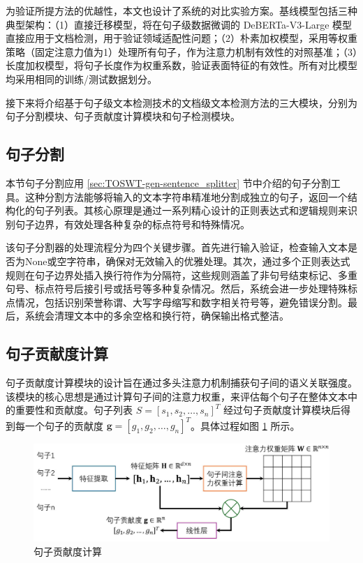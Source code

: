 为验证所提方法的优越性，本文也设计了系统的对比实验方案。基线模型包括三种典型架构：（1）直接迁移模型，将在句子级数据微调的 DeBERTa-V3-Large 模型直接应用于文档检测，用于验证领域适配性问题；（2）朴素加权模型，采用等权重策略（固定注意力值为1）处理所有句子，作为注意力机制有效性的对照基准；（3）长度加权模型，将句子长度作为权重系数，验证表面特征的有效性。所有对比模型均采用相同的训练/测试数据划分。

接下来将介绍基于句子级文本检测技术的文档级文本检测方法的三大模块，分别为句子分割模块、句子贡献度计算模块和句子检测模块。

\subsection{句子分割}

本节句子分割应用 \ref{sec:TOSWT-gen-sentence_splitter} 节中介绍的句子分割工具。这种分割方法能够将输入的文本字符串精准地分割成独立的句子，返回一个结构化的句子列表。其核心原理是通过一系列精心设计的正则表达式和逻辑规则来识别句子边界，有效处理各种复杂的标点符号和特殊情况。

该句子分割器的处理流程分为四个关键步骤。首先进行输入验证，检查输入文本是否为None或空字符串，确保对无效输入的优雅处理。其次，通过多个正则表达式规则在句子边界处插入换行符作为分隔符，这些规则涵盖了非句号结束标记、多重句号、标点符号后接引号或括号等多种复杂情况。然后，系统会进一步处理特殊标点情况，包括识别荣誉称谓、大写字母缩写和数字相关符号等，避免错误分割。最后，系统会清理文本中的多余空格和换行符，确保输出格式整洁。

\subsection{句子贡献度计算}

句子贡献度计算模块的设计旨在通过多头注意力机制捕获句子间的语义关联强度。该模块的核心思想是通过计算句子间的注意力权重，来评估每个句子在整体文本中的重要性和贡献度。句子列表 \( S = [s_1, s_2, \ldots, s_n]^T\) 经过句子贡献度计算模块后得到每一个句子的贡献度 \( \textbf{g} = [g_1, g_2, \ldots, g_n]^T\)。具体过程如图 \ref{fig:method-sent-contribution} 所示。

\begin{figure}[htbp]
    \centering
    \includegraphics[width=\textwidth]{figures/sent-contribution.jpg}
    \caption{句子贡献度计算}
    \label{fig:method-sent-contribution}
\end{figure}

